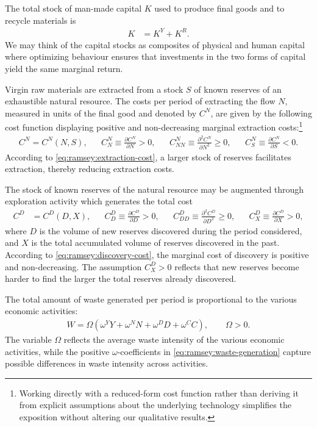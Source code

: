The total stock of man-made capital $K$ used to produce final goods and to recycle materials is
\begin{align}
K &= K^Y + K^R.
\label{eq:ramsey:capital-allocation}
\end{align}
We may think of the capital stocks as composites of physical and human capital where optimizing behaviour ensures that investments in the two forms of capital yield the same marginal return.

Virgin raw materials are extracted from a stock $S$ of known reserves of an exhaustible natural resource. The costs per period of extracting the flow $N$, measured in units of the final good and denoted by $C^N$, are given by the following cost function displaying positive and non-decreasing marginal extraction costs:\footnote{Working directly with a reduced-form cost function rather than deriving it from explicit assumptions about the underlying technology simplifies the exposition without altering our qualitative results.}
\begin{align}\label{eq:ramsey:extraction-cost}
C^N = C^N(N,S), && C_N^N \equiv \frac{\partial C^N}{\partial N} > 0, && C_{NN}^N \equiv \frac{\partial^2 C^N}{\partial N^2} \ge 0, &&
C_S^N \equiv \frac{\partial C^N}{\partial S} < 0.
\end{align}
According to \eqref{eq:ramsey:extraction-cost}, a larger stock of reserves facilitates extraction, thereby reducing extraction costs.

The stock of known reserves of the natural resource may be augmented through exploration activity which generates the total cost
\begin{align}\label{eq:ramsey:discovery-cost}
C^D &= C^D(D,X), &&
C_D^D \equiv \frac{\partial C^D}{\partial D} > 0,
&&
C_{DD}^D \equiv \frac{\partial^2 C^D}{\partial D^2} \ge 0,
&&
C_X^D \equiv \frac{\partial C^D}{\partial X} > 0,
\end{align}
where $D$ is the volume of new reserves discovered during the period considered, and $X$ is the total accumulated volume of reserves discovered in the past. According to \eqref{eq:ramsey:discovery-cost}, the marginal cost of discovery is positive and non-decreasing. The assumption $C_X^D > 0$ reflects that new reserves become harder to find the larger the total reserves already discovered.

The total amount of waste generated per period is proportional to the various economic activities:
\begin{align}\label{eq:ramsey:waste-generation}
W = \Omega\left(\omega^Y Y + \omega^N N + \omega^D D + \omega^C C\right), \qquad \Omega > 0.
\end{align}
The variable $\Omega$ reflects the average waste intensity of the various economic activities, while the positive $\omega$-coefficients in \eqref{eq:ramsey:waste-generation} capture possible differences in waste intensity across activities.


